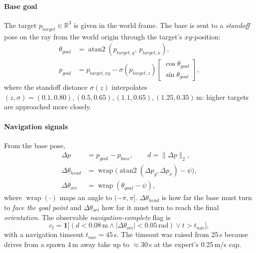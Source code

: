 \documentclass[conference]{IEEEtran}
\newcommand{\dagnorm}[1]{\lVert #1\rVert_2}            %
\newcommand{\dagwrap}{\operatorname{wrap}}             %
\newcommand{\dagone}{\mathbf{1}}                       %
\begin{document}
\paragraph{Base goal} The target $p_{target}\in\mathbb{R}^3$ is given in the world frame. The base is sent to a \emph{standoff} pose on the ray from the world origin through the target's $xy$-position:
\begin{equation}
\begin{aligned}
  \theta_{goal}&=\operatorname{atan2}(p_{target,y},\,p_{target,x}),\\
  p_{goal}&=p_{target,xy}-\sigma(p_{target,z})\begin{bmatrix}\cos\theta_{goal}\\ \sin\theta_{goal}\end{bmatrix},
\end{aligned}
\label{dag:goalpose}
\end{equation}
where the standoff distance $\sigma(z)$ interpolates $(z,\sigma)=(0.1,0.80),(0.5,0.65),(1.1,0.65),(1.25,0.35)$\,m: higher targets are approached more closely.

\paragraph{Navigation signals} From the base pose,
\begin{equation}
\begin{aligned}
  \Delta p&=p_{goal}-p_{base},\qquad d=\dagnorm{\Delta p},\\
  \Delta\theta_{head}&=\dagwrap\bigl(\operatorname{atan2}(\Delta p_y,\Delta p_x)-\psi\bigr),\\
  \Delta\theta_{ori}&=\dagwrap(\theta_{goal}-\psi),
\end{aligned}
\label{dag:geom}
\end{equation}
where $\dagwrap(\cdot)$ maps an angle to $(-\pi,\pi]$. $\Delta\theta_{head}$ is how far the base must turn to \emph{face the goal point} and $\Delta\theta_{ori}$ how far it must turn to reach the final \emph{orientation}. The observable \emph{navigation-complete} flag is
\begin{equation}
  c_t=\dagone\bigl[(d<0.08\,\text{m}\wedge|\Delta\theta_{ori}|<0.05\,\text{rad})\vee t>t_{nav}\bigr],
\label{dag:nav}
\end{equation}
with a navigation timeout $t_{nav}=45$\,s. The timeout was raised from 25\,s because drives from a spawn 4\,m away take up to $\approx 30$\,s at the expert's 0.25\,m/s cap.
\end{document}
